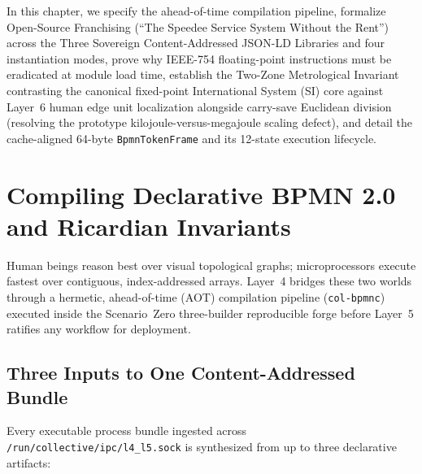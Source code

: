 In this chapter, we specify the ahead-of-time compilation pipeline, formalize Open-Source
Franchising (``The Speedee Service System Without the Rent'') across the Three Sovereign
Content-Addressed JSON-LD Libraries and four instantiation modes, prove why IEEE-754
floating-point instructions must be eradicated at module load time, establish the Two-Zone
Metrological Invariant contrasting the canonical fixed-point International System (SI) core
against Layer~6 human edge unit localization alongside carry-save Euclidean division
(resolving the prototype kilojoule-versus-megajoule scaling defect), and detail the
cache-aligned 64-byte \texttt{BpmnTokenFrame} and its 12-state execution lifecycle.

\section{Compiling Declarative BPMN 2.0 and Ricardian Invariants}
\label{sec:ch2-bpmn-compilation}

Human beings reason best over visual topological graphs; microprocessors execute fastest
over contiguous, index-addressed arrays. Layer~4 bridges these two worlds through a
hermetic, ahead-of-time (AOT) compilation pipeline (\texttt{col-bpmnc}) executed inside the
Scenario~Zero three-builder reproducible forge before Layer~5 ratifies any workflow for
deployment.

\subsection{Three Inputs to One Content-Addressed Bundle}

Every executable process bundle ingested across \texttt{/run/collective/ipc/l4\_l5.sock} is
synthesized from up to three declarative artifacts:


